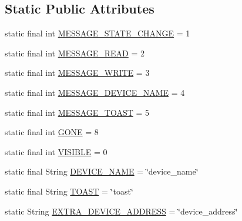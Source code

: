 \subsection*{Static Public Attributes}
\begin{DoxyCompactItemize}
\item 
static final int \hyperlink{classcom_1_1example_1_1android_1_1_bluetooth_chat_1_1_l_a_s_a_r_control_a54eaad8c061d8286ba78ae22323a4f2a}{M\-E\-S\-S\-A\-G\-E\-\_\-\-S\-T\-A\-T\-E\-\_\-\-C\-H\-A\-N\-G\-E} = 1
\item 
static final int \hyperlink{classcom_1_1example_1_1android_1_1_bluetooth_chat_1_1_l_a_s_a_r_control_ab0d2082ba2cfcb36adabfec0fb604e28}{M\-E\-S\-S\-A\-G\-E\-\_\-\-R\-E\-A\-D} = 2
\item 
static final int \hyperlink{classcom_1_1example_1_1android_1_1_bluetooth_chat_1_1_l_a_s_a_r_control_a1b526d54fa3f99e607ff4a1e17cfa136}{M\-E\-S\-S\-A\-G\-E\-\_\-\-W\-R\-I\-T\-E} = 3
\item 
static final int \hyperlink{classcom_1_1example_1_1android_1_1_bluetooth_chat_1_1_l_a_s_a_r_control_add64add7196452d793891b8d0805cb8f}{M\-E\-S\-S\-A\-G\-E\-\_\-\-D\-E\-V\-I\-C\-E\-\_\-\-N\-A\-M\-E} = 4
\item 
static final int \hyperlink{classcom_1_1example_1_1android_1_1_bluetooth_chat_1_1_l_a_s_a_r_control_aeb3b8c4dc7dfb4ee445d2d4afc5b65c0}{M\-E\-S\-S\-A\-G\-E\-\_\-\-T\-O\-A\-S\-T} = 5
\item 
static final int \hyperlink{classcom_1_1example_1_1android_1_1_bluetooth_chat_1_1_l_a_s_a_r_control_af184001c124497a8668c657a12086ec6}{G\-O\-N\-E} = 8
\item 
static final int \hyperlink{classcom_1_1example_1_1android_1_1_bluetooth_chat_1_1_l_a_s_a_r_control_ace98d3d6a968cb69d71e71476d37b8c0}{V\-I\-S\-I\-B\-L\-E} = 0
\item 
static final String \hyperlink{classcom_1_1example_1_1android_1_1_bluetooth_chat_1_1_l_a_s_a_r_control_aeb66e03c65cb4e4c8cecd9b5e9542612}{D\-E\-V\-I\-C\-E\-\_\-\-N\-A\-M\-E} = \char`\"{}device\-\_\-name\char`\"{}
\item 
static final String \hyperlink{classcom_1_1example_1_1android_1_1_bluetooth_chat_1_1_l_a_s_a_r_control_adafe8a0d70641fa1cab3d27fa09742e7}{T\-O\-A\-S\-T} = \char`\"{}toast\char`\"{}
\item 
static String \hyperlink{classcom_1_1example_1_1android_1_1_bluetooth_chat_1_1_l_a_s_a_r_control_adfb4e91cee59f339c15f8ae793db217a}{E\-X\-T\-R\-A\-\_\-\-D\-E\-V\-I\-C\-E\-\_\-\-A\-D\-D\-R\-E\-S\-S} = \char`\"{}device\-\_\-address\char`\"{}
\end{DoxyCompactItemize}
